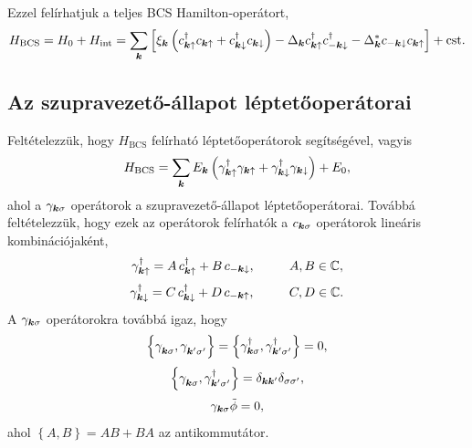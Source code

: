 \documentclass[a4paper,12pt,titlepage]{article}
\newcommand{\KK}{{\vb*{k}}}
\newcommand{\phantomdagger}{{\phantom{\dagger}}}
\begin{document}
Ezzel felírhatjuk a teljes BCS Hamilton-operátort,
\begin{equation}
	H_\text{BCS} = H_0 + H_\text{int} = \sum\limits_\KK \left[ \xi_\KK \left( c_{\KK \uparrow}^\dagger c_{\KK \uparrow} + c_{\KK \downarrow}^\dagger c_{\KK \downarrow} \right) - \Delta_\KK c_{\KK \uparrow}^\dagger c_{-\KK \downarrow}^\dagger - \Delta_\KK^* c_{-\KK \downarrow} c_{\KK \uparrow} \right] + \text{cst}.
\end{equation}


\subsection{Az szupravezető-állapot léptetőoperátorai}

Feltételezzük, hogy $H_\text{BCS}$ felírható léptetőoperátorok segítségével, vagyis
\begin{equation} \label{H-BCS}
	H_\text{BCS} = \sum\limits_\KK E_\KK \left( \gamma_{\KK \uparrow}^\dagger \gamma_{\KK \uparrow} + \gamma_{\KK \downarrow}^\dagger \gamma_{\KK \downarrow} \right) + E_0,
\end{equation}
ahol a $\gamma_{\KK \sigma}$ operátorok a szupravezető-állapot léptetőoperátorai.  Továbbá feltételezzük, hogy ezek az operátorok felírhatók a $c_{\KK \sigma}$ operátorok lineáris kombinációjaként,
\begin{equation} \label{gamma-from-c}
	\gamma_{\KK \uparrow}^\dagger = A \, c_{\KK \uparrow}^\dagger + B \, c_{-\KK \downarrow}, ~~~~~~~~ A, B \in \mathbb{C},
\end{equation}
\begin{equation}
	\gamma_{\KK \downarrow}^\dagger = C \, c_{\KK \downarrow}^\dagger + D \, c_{-\KK \uparrow}, ~~~~~~~~ C, D \in \mathbb{C}.
\end{equation}
A $\gamma_{\KK \sigma}$ operátorokra továbbá igaz, hogy
\begin{equation} \label{gamma-anticommutator-zero}
	\left\{ \gamma_{\KK \sigma}^\phantomdagger, \gamma_{\KK^\prime \sigma^\prime}^\phantomdagger \right\} = \left\{ \gamma_{\KK \sigma}^\dagger, \gamma_{\KK^\prime \sigma^\prime}^\dagger \right\} = 0,
\end{equation}
\begin{equation} \label{gamma-anticommutator}
	\left\{ \gamma_{\KK \sigma}^\phantomdagger, \gamma_{\KK^\prime \sigma^\prime}^\dagger \right\} = \delta_{\KK \KK^\prime} \delta_{\sigma \sigma^\prime},
\end{equation}
\begin{equation} \label{gamma-zero}
	\gamma_{\KK \sigma} \tilde{\phi} = 0,
\end{equation}
ahol $\left\{ A, B \right\} = A B + B A$ az antikommutátor.
\end{document}
